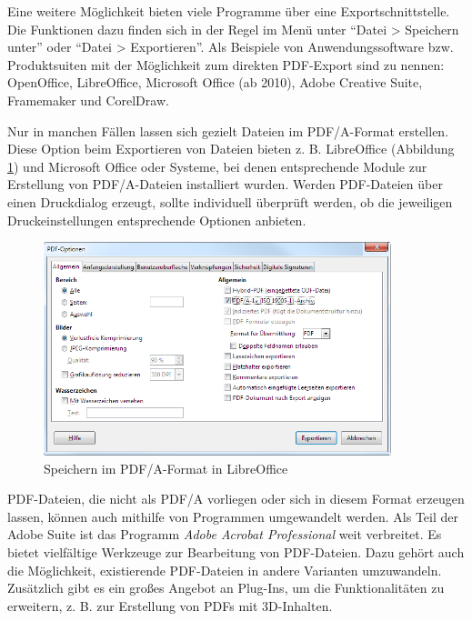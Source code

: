 Eine weitere Möglichkeit bieten viele Programme über eine Exportschnittstelle. Die Funktionen dazu finden sich in der Regel im Menü unter "`Datei > Speichern unter"' oder "`Datei > Exportieren"'. Als Beispiele von Anwendungssoftware bzw. Produktsuiten mit der Möglichkeit zum direkten PDF-Export sind zu nennen: OpenOffice, LibreOffice, Microsoft Office (ab 2010), Adobe Creative Suite, Framemaker und CorelDraw.

Nur in manchen Fällen lassen sich gezielt Dateien im PDF/A-Format erstellen. Diese Option beim Exportieren von Dateien bieten z. B. LibreOffice (Abbildung \ref{abb:pdf-pdfAlibreOffice}) und Microsoft Office oder Systeme, bei denen entsprechende Module zur Erstellung von PDF/A-Dateien installiert wurden. Werden PDF-Dateien über einen Druckdialog erzeugt, sollte individuell überprüft werden, ob die jeweiligen Druckeinstellungen entsprechende Optionen anbieten.

\begin{figure}[h!tb]
  \begin{center}
    \includegraphics[width=0.9\textwidth]{bilder/PDF_libreoffice_pdfa}
  \end{center}
  \caption{Speichern im PDF/A-Format in LibreOffice}
	\label{abb:pdf-pdfAlibreOffice}
\end{figure}

PDF-Dateien, die nicht als PDF/A vorliegen oder sich in diesem Format erzeugen lassen, können auch mithilfe von Programmen umgewandelt werden. Als Teil der Adobe Suite ist das Programm \emph{Adobe Acrobat Professional} weit verbreitet. Es bietet vielfältige Werkzeuge zur Bearbeitung von PDF-Dateien. Dazu gehört auch die Möglichkeit, existierende PDF-Dateien in andere Varianten umzuwandeln. Zusätzlich gibt es ein großes Angebot an Plug-Ins, um die Funktionalitäten zu erweitern, z. B. zur Erstellung von PDFs mit 3D-Inhalten.

